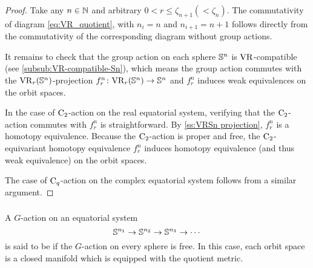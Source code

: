 \begin{proof}
    Take any $n \in \mathbb{N}$ and arbitrary $0 < r \leq \zeta_{n+1} (< \zeta_{n})$.
    The commutativity of diagram \ref{eq:VR_quotient}, with $n_i = n$ and $n_{i+1} = n+1$ follows directly from the commutativity of the corresponding diagram without group actions.

    It remains to check that the group action on each sphere $\mathbb{S}^n$ is \(\mathrm{VR}\)-compatible (see \cref{subsub:VR-compatible-Sn}), which means the group action commutes with the $\mathrm{VR}_r(\mathbb{S}^{n})$-projection $f_r^{n}\colon \mathrm{VR}_r(\mathbb{S}^{n}) \to \mathbb{S}^{n}$ and $f_r^{n}$ induces weak equivalences on the orbit spaces.

    In the case of $\mathrm{C}_2$-action on the real equatorial system, verifying that the $\mathrm{C}_2$-action commutes with $f_r^{n}$ is straightforward.
    By \cref{ss:VRSn projection}, $f_r^{n}$ is a homotopy equivalence.
    Because the $\mathrm{C}_2$-action is proper and free, the $\mathrm{C}_2$-equivariant homotopy equivalence $f_r^n$ induces homotopy equivalence (and thus weak equivalence) on the orbit spaces.

    The case of $\mathrm{C}_q$-action on the complex equatorial system follows from a similar argument.
\end{proof}

\subsubsection{}\label{subsub:foundamental_bar_rpn_lemma}

A \(G\)-action on an equatorial system
\[
\mathbb{S}^{n_1} \to \mathbb{S}^{n_2} \to \mathbb{S}^{n_3} \to \dotsb
\]
is said to be  if the \(G\)-action on every sphere is free.
In this case, each orbit space is a closed manifold which is equipped with the quotient metric.


